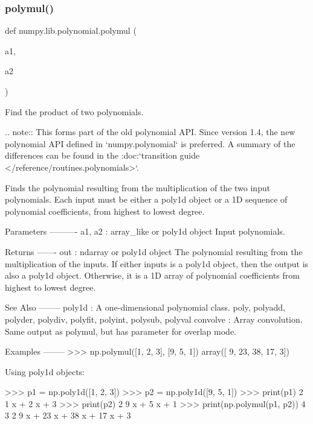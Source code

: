 \subsubsection{\texorpdfstring{polymul()}{polymul()}}
{\footnotesize\ttfamily def numpy.\+lib.\+polynomial.\+polymul (\begin{DoxyParamCaption}\item[{}]{a1,  }\item[{}]{a2 }\end{DoxyParamCaption})}

\begin{DoxyVerb}Find the product of two polynomials.

.. note::
   This forms part of the old polynomial API. Since version 1.4, the
   new polynomial API defined in `numpy.polynomial` is preferred.
   A summary of the differences can be found in the
   :doc:`transition guide </reference/routines.polynomials>`.

Finds the polynomial resulting from the multiplication of the two input
polynomials. Each input must be either a poly1d object or a 1D sequence
of polynomial coefficients, from highest to lowest degree.

Parameters
----------
a1, a2 : array_like or poly1d object
    Input polynomials.

Returns
-------
out : ndarray or poly1d object
    The polynomial resulting from the multiplication of the inputs. If
    either inputs is a poly1d object, then the output is also a poly1d
    object. Otherwise, it is a 1D array of polynomial coefficients from
    highest to lowest degree.

See Also
--------
poly1d : A one-dimensional polynomial class.
poly, polyadd, polyder, polydiv, polyfit, polyint, polysub, polyval
convolve : Array convolution. Same output as polymul, but has parameter
           for overlap mode.

Examples
--------
>>> np.polymul([1, 2, 3], [9, 5, 1])
array([ 9, 23, 38, 17,  3])

Using poly1d objects:

>>> p1 = np.poly1d([1, 2, 3])
>>> p2 = np.poly1d([9, 5, 1])
>>> print(p1)
   2
1 x + 2 x + 3
>>> print(p2)
   2
9 x + 5 x + 1
>>> print(np.polymul(p1, p2))
   4      3      2
9 x + 23 x + 38 x + 17 x + 3\end{DoxyVerb}
 \mbox{\label{namespacenumpy_1_1lib_1_1polynomial_a82ed7a695338e1fd554add2135a655ab}} 
